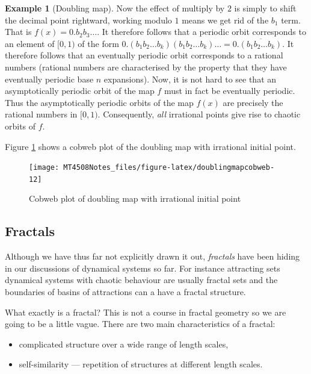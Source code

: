 \documentclass[
  a4paper,
  oneside,
  final]{krantz}
\providecommand{\tightlist}{%
  \setlength{\itemsep}{0pt}\setlength{\parskip}{0pt}}
\theoremstyle{definition}
\theoremstyle{definition}
\newtheorem{example}{Example}[chapter]
\theoremstyle{definition}
\theoremstyle{definition}
\theoremstyle{remark}
\begin{document}
\begin{example}[Doubling map]
Now the effect of multiply by \(2\) is simply to shift the decimal point rightward, working modulo \(1\) means we get rid of the \(b_1\) term. That is \(f(x) = 0.b_2 b_3 \ldots\). It therefore follows that a periodic orbit corresponds to an element of \([0,1)\) of the form \(0.(b_1 b_2 \ldots b_k)(b_1 b_2 \ldots b_k)\ldots = 0.\overline{(b_1 b_2 \ldots b_k)}\). It therefore follows that an eventually periodic orbit corresponds to a rational numbers (rational numbers are characterised by the property that they have eventually periodic base \(n\) expansions). Now, it is not hard to see that an asymptotically periodic orbit of the map \(f\) must in fact be eventually periodic. Thus the asymptotically periodic orbits of the map \(f(x)\) are precisely the rational numbers in \([0,1)\). Consequently, \emph{all} irrational points give rise to chaotic orbits of \(f\).

Figure \ref{fig:doublingmapcobweb} shows a cobweb plot of the doubling map with irrational initial point.

\begin{figure}

{\centering \texttt{[image: MT4508Notes\_files/figure-latex/doublingmapcobweb-12]} 

}

\caption{Cobweb plot of doubling map with irrational initial point}\label{fig:doublingmapcobweb}
\end{figure}

\end{example}

\hypertarget{fractals}{%
\subsection{Fractals}\label{fractals}}

Although we have thus far not explicitly drawn it out, \emph{fractals} have been hiding in our discussions of dynamical systems so far. For instance attracting sets dynamical systems with chaotic behaviour are usually fractal sets and the boundaries of basins of attractions can a have a fractal structure.

What exactly is a fractal? This is not a course in fractal geometry so we are going to be a little vague. There are two main characteristics of a fractal:

\begin{itemize}
\tightlist
\item
  complicated structure over a wide range of length scales,
\item
  self-similarity --- repetition of structures at different length scales.
\end{itemize}
\end{document}
